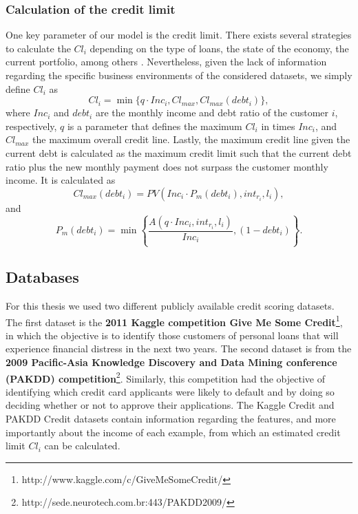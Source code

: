   \subsubsection{Calculation of the credit limit}
  
  One key parameter of our model is the credit limit. There exists several strategies to calculate 
  the $Cl_i$ depending on the type of loans, the state of the economy, the current portfolio, 
  among others \citep{Anderson2007,Lawrence2012}. Nevertheless, given the lack of information 
  regarding the specific business environments of the considered datasets, we simply define 
  $Cl_i$ as
  \begin{equation}\label{eq:cli}
      Cl_i = \min \bigg\{ q \cdot Inc_i, Cl_{max}, Cl_{max}(debt_i) \bigg\},
  \end{equation}
  where $Inc_i$ and $debt_i$ are the monthly income and debt ratio of the customer $i$, 
  respectively, $q$ is a parameter that defines the maximum $Cl_i$ in times $Inc_i$, and 
  $Cl_{max}$ the maximum overall credit line. Lastly, the maximum credit line given the current 
  debt is calculated as the maximum credit limit such that the current debt ratio plus the new 
  monthly payment does not surpass the customer monthly income. It is calculated as
  \begin{equation}
    Cl_{max}(debt_i)=PV\left(Inc_i \cdot P_{m}(debt_i),int_{r_i},l_i\right),
  \end{equation}
  and
  \begin{equation}
    P_{m}(debt_i)=\min \left\{ \frac{A(q \cdot Inc_i,int_{r_i},l_i)}{Inc_i},\left(1-debt_i 
    \right) \right\}.
  \end{equation}
  
  
  \subsection{Databases}

    For this thesis we used two different publicly available credit scoring datasets. The first 
    dataset is the \textbf{2011 Kaggle competition Give Me Some Credit}\footnote{ 
    http://www.kaggle.com/c/GiveMeSomeCredit/}, in which the objective is to identify those 
    customers of personal loans that will experience financial distress in the next two years.
    The second dataset is from the \textbf{2009 Pacific-Asia Knowledge Discovery and Data Mining 
    conference (PAKDD) competition}\footnote{http://sede.neurotech.com.br:443/PAKDD2009/}.
    Similarly, this competition had the objective of identifying which credit card applicants
    were likely to default and by doing so deciding whether or not to approve their applications.
    The Kaggle Credit and PAKDD Credit datasets contain information regarding the features, and 
    more importantly about the income of each example, from which an estimated credit limit 
    $Cl_i$ can be calculated.
    
